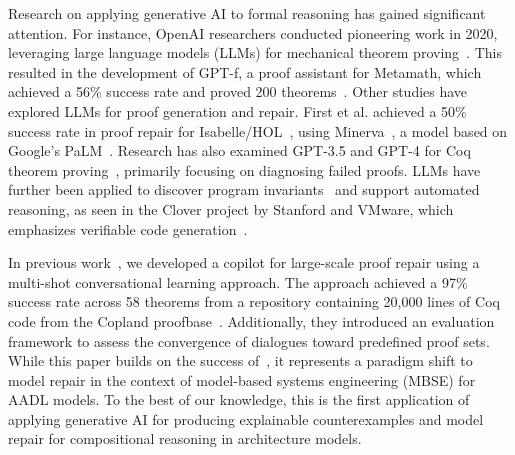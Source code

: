 Research on applying generative AI to formal reasoning has gained significant attention. For instance, OpenAI researchers conducted pioneering work in 2020, leveraging large language models (LLMs) for mechanical theorem proving~\cite{polu2020generative}. This resulted in the development of GPT-f, a proof assistant for Metamath, which achieved a 56\% success rate and proved 200 theorems~\cite{megill2019metamath}. Other studies have explored LLMs for proof generation and repair. First et al. achieved a 50\% success rate in proof repair for Isabelle/HOL~\cite{first2023baldur}, using Minerva~\cite{lewkowycz2022solving}, a model based on Google’s PaLM~\cite{chowdhery2022palm}. Research has also examined GPT-3.5 and GPT-4 for Coq theorem proving~\cite{zhang2023getting}, primarily focusing on diagnosing failed proofs. LLMs have further been applied to discover program invariants~\cite{pei2023can, wu2023lemur} and support automated reasoning, as seen in the Clover project by Stanford and VMware, which emphasizes verifiable code generation~\cite{sun2024clover}.

In previous work~\cite{CoqDog, CoqDogHCSS24}, we developed a copilot for large-scale proof repair using a multi-shot conversational learning approach. The approach achieved a 97\% success rate across 58 theorems from a repository containing 20,000 lines of Coq code from the Copland proofbase~\cite{CoqDog}. Additionally, they introduced an evaluation framework to assess the convergence of dialogues toward predefined proof sets.
%
While this paper builds on the success of~\cite{CoqDog}, it represents a paradigm shift to model repair in the context of model-based systems engineering (MBSE) for AADL models. %
To the best of our knowledge, this is the first application of applying generative AI for producing explainable counterexamples and model repair for compositional reasoning in architecture models.
